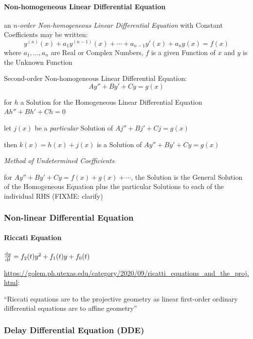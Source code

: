 {\paragraph{Non-homogeneous Linear Differential Equation}
\label{sec:nonhomogeneous_linear_differential}\hfill

an \emph{$n$-order Non-homogeneous Linear Differential Equation} with Constant
Coefficients may be written:
\[
  y^{(n)}(x) + a_1y^{(n-1)}(x) + \cdots + a_{n-1}y'(x) + a_ny(x) = f(x)
\]
where $a_1,\ldots,a_n$ are Real or Complex Numbers, $f$ is a given Function of
$x$ and $y$ is the Unknown Function

Second-order Non-homogeneous Linear Differential Equation:
\[
  A y'' + B y' + C y = g(x)
\]

for $h$ a Solution for the Homogeneous Linear Differential Equation $Ah'' + Bh'
+ Ch = 0$

let $j(x)$ be a \emph{particular} Solution of $Aj'' + Bj' + Cj = g(x)$

then $k(x) = h(x) + j(x)$ is a Solution of $A y'' + B y' + C y = g(x)$

\emph{Method of Undetermined Coefficients}

for $A y'' + B y' + C y = f(x) + g(x) + \cdots$, the Solution is the General
Solution of the Homogeneous Equation plus the particular Solutions to each of
the individual RHS (FIXME: clarify)



\subsubsection{Non-linear Differential Equation}
\label{sec:nonlinear_differential_equation}

\paragraph{Riccati Equation}\label{sec:riccati_equation}\hfill

$\frac{\mathrm{d}y}{\mathrm{d}t} = f_2(t)y^2 + f_1(t)y + f_0(t)$

\url{https://golem.ph.utexas.edu/category/2020/09/ricatti_equations_and_the_proj.html}:

``Riccati equations are to the projective geometry as linear first-order
ordinary differential equations are to affine geometry''



\subsubsection{Delay Differential Equation (DDE)}\label{sec:dde}

}
